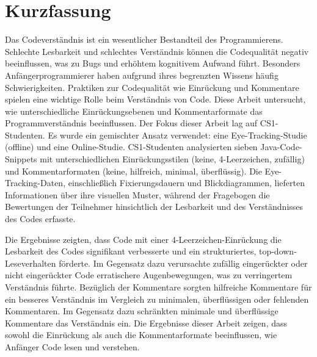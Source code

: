 \documentclass[14pt, a4paper, twoside, bibliography=totoc, headsepline, cleardoublepage=empty, parskip=half, draft=false]{scrbook}
\begin{document}




\Coverpage

\Copyright

\pagestyle{preamble}
\renewcommand*{\chapterpagestyle}{preamble}

\pagestyle{empty}

\section*{Kurzfassung}
Das Codeverständnis ist ein wesentlicher Bestandteil des Programmierens. Schlechte Lesbarkeit und schlechtes Verständnis können die Codequalität negativ beeinflussen, was zu Bugs und erhöhtem kognitivem Aufwand führt. Besonders Anfängerprogrammierer haben aufgrund ihres begrenzten Wissens häufig Schwierigkeiten. Praktiken zur Codequalität wie Einrückung und Kommentare spielen eine wichtige Rolle beim Verständnis von Code. Diese Arbeit untersucht, wie unterschiedliche Einrückungsebenen und Kommentarformate das Programmverständnis beeinflussen. Der Fokus dieser Arbeit lag auf CS1-Studenten. Es wurde ein gemischter Ansatz verwendet: eine Eye-Tracking-Studie (offline) und eine Online-Studie. CS1-Studenten analysierten sieben Java-Code-Snippets mit unterschiedlichen Einrückungsstilen (keine, 4-Leerzeichen, zufällig) und Kommentarformaten (keine, hilfreich, minimal, überflüssig). Die Eye-Tracking-Daten, einschließlich Fixierungsdauern und Blickdiagrammen, lieferten Informationen über ihre visuellen Muster, während der Fragebogen die Bewertungen der Teilnehmer hinsichtlich der Lesbarkeit und des Verständnisses des Codes erfasste. 

Die Ergebnisse zeigten, dass Code mit einer 4-Leerzeichen-Einrückung die Lesbarkeit des Codes signifikant verbesserte und ein strukturiertes, top-down-Leseverhalten förderte. Im Gegensatz dazu verursachte zufällig eingerückter oder nicht eingerückter Code erratischere Augenbewegungen, was zu verringertem Verständnis führte. Bezüglich der Kommentare sorgten hilfreiche Kommentare für ein besseres Verständnis im Vergleich zu minimalen, überflüssigen oder fehlenden Kommentaren. Im Gegensatz dazu schränkten minimale und überflüssige Kommentare das Verständnis ein. Die Ergebnisse dieser Arbeit zeigen, dass sowohl die Einrückung als auch die Kommentarformate beeinflussen, wie Anfänger Code lesen und verstehen.
\end{document}
